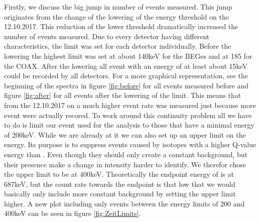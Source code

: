 \documentclass[encoding=utf8,british]{tumphthesis}
\begin{document}
Firstly, we discuss the big jump in number of events measured.
This jump originates from the change of the lowering of the energy threshold on the 12.10.2017.
This reduction of the lower threshold dramatically increased the number of events measured.
Due to every detector having different characteristics, the limit was set for each detector individually.
Before the lowering the highest limit was set at about 140keV for the BEGes and at 185 for the COAX.
After the lowering all event with an energy of at least about 15keV could be recorded by all detectors.
For a more graphical representation, see the beginning of the spectra in figure \ref{fig:before} for all events measured before and figure \ref{fig:after} for all events after the lowering of the limit. 
This means that from the 12.10.2017 on a much higher event rate was measured just because more event were actually recored.
To work around this continuity problem all we have to do is limit our event used for the analysis to those that have a minimal energy of 200keV. 
While we are already at it we can also set up an upper limit on the energy.
Its purpose is to suppress events caused by isotopes with a higher Q-value energy than \Kr.
Even though they should only create a constant background, but their presence make a change in intensity harder to identify.
We therefor chose the upper limit to be at 400keV.
Theoretically the endpoint energy of \Kr is at 687keV, but the count rate towards the endpoint is that low that we would basically only include more constant background by setting the upper limit higher.
A new plot including only events between the energy limits of 200 and 400keV can be seen in figure \ref{fig:ZeitLimits}.
\\
\end{document}
